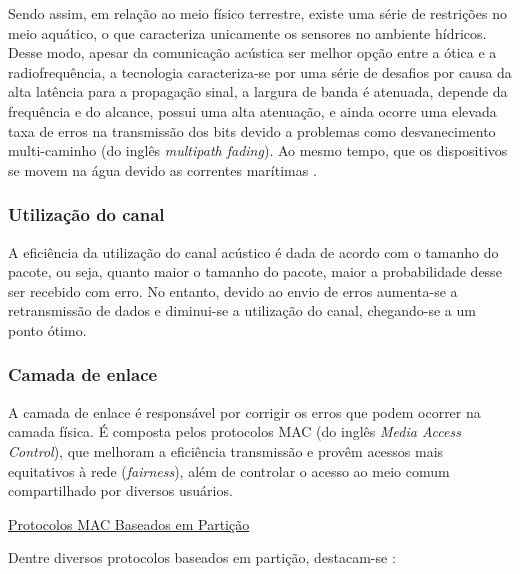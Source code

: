 Sendo assim, em relação ao meio físico terrestre, existe uma série de restrições no meio aquático, o que caracteriza unicamente os sensores no ambiente hídricos. Desse modo, apesar da comunicação acústica ser melhor opção entre a ótica e a radiofrequência, a tecnologia caracteriza-se por uma série de desafios por causa da alta latência para a propagação sinal, a largura de banda é atenuada, depende da frequência e do alcance, possui uma alta atenuação, e ainda ocorre uma elevada taxa de erros na transmissão dos bits devido a problemas como desvanecimento multi-caminho (do inglês \textit{multipath fading}). Ao mesmo tempo, que os dispositivos se movem na água devido as correntes marítimas \cite{vieira2010redes}.

\subsubsection*{Utilização do canal}

A eficiência da utilização do canal acústico é dada de acordo com o tamanho do pacote, ou seja, quanto maior o tamanho do pacote, maior a probabilidade desse ser recebido com erro. No entanto, devido ao envio de erros aumenta-se a retransmissão de dados e diminui-se a utilização do canal, chegando-se a um ponto ótimo.

\subsubsection*{Camada de enlace}

A camada de enlace é responsável por corrigir os erros que podem ocorrer na camada física. É composta pelos protocolos MAC (do inglês \textit{Media Access Control}), que melhoram a eficiência transmissão e provêm acessos mais equitativos à rede (\textit{fairness}), além de controlar o acesso ao meio comum compartilhado por diversos usuários.
 
\underline{Protocolos MAC Baseados em Partição}

Dentre diversos protocolos baseados em partição, destacam-se \cite{vieira2010redes}:

